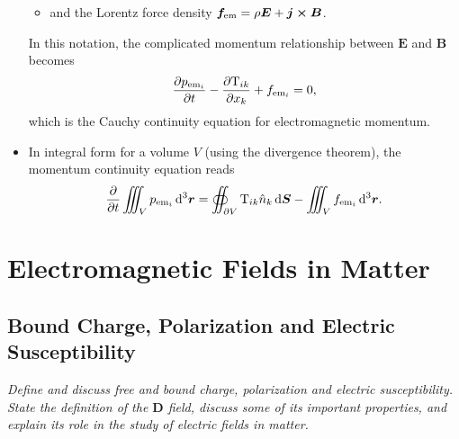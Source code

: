 \documentclass[11pt, a4paper]{article}
\newcommand{\diff}{\mathop{}\!\mathrm{d}} %
\newcommand{\dr}{\diff^{3} \r}  %
\renewcommand{\vec}[1]{\bm{#1}} %
\renewcommand{\r}{\vec{r}}
\newcommand{\E}{\vec{E}} %
\newcommand{\D}{\vec{D}}  %
\newcommand{\B}{\vec{B}} %
\newcommand{\TT}{\mathrm{T}}  %
\renewcommand{\j}{\vec{j}}  %
\begin{document}
\begin{itemize}
\begin{itemize}
        \item and the Lorentz force density $ \vec{f}_{\text{em}} = \rho \E + \j \cross \B $.
    \end{itemize}
	In this notation, the complicated momentum relationship between $ \E $ and $ \B $ becomes
	\begin{equation*}
		\pdv{p_{\text{em}_{i}}}{t} - \pdv{\TT_{ik}}{x_{k}} + f_{\text{em}_{i}} = 0,
	\end{equation*}
	which is the Cauchy continuity equation for electromagnetic momentum.
	
	\item In integral form for a volume $ V $ (using the divergence theorem), the momentum continuity equation reads
	\begin{equation*}
		\pdv{t}\iiint_{V}p_{\text{em}_{i}}\dr = \oiint_{\partial V}\TT_{ik}\hat{n}_{k} \diff \vec{S} - \iiint_{V} f_{\text{em}_{i}}\dr.
	\end{equation*}
	
\end{itemize}


\newpage
\section{Electromagnetic Fields in Matter}

\subsection{Bound Charge, Polarization and Electric Susceptibility}
\textit{Define and discuss free and bound charge, polarization and electric susceptibility. State the definition of the $ \D $ field, discuss some of its important properties, and explain its role in the study of electric fields in matter.}
\end{document}
